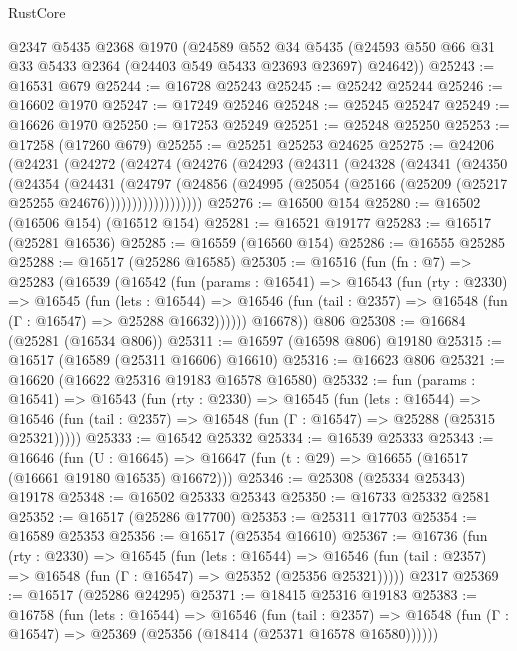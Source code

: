 \begin{lexlean}{RustCore}
\begin{coremodule}
    @2347
    @5435
    @2368
    @1970
    (@24589
      @552
      @34
      @5435
      (@24593 @550 @66 @31 @33 @5433 @2364 (@24403 @549 @5433 @23693 @23697) @24642))
@25243 := @16531 @679
@25244 := @16728 @25243
@25245 := @25242 @25244
@25246 := @16602 @1970
@25247 := @17249 @25246
@25248 := @25245 @25247
@25249 := @16626 @1970
@25250 := @17253 @25249
@25251 := @25248 @25250
@25253 := @17258 (@17260 @679)
@25255 := @25251 @25253 @24625
@25275 := @24206
    (@24231
      (@24272
        (@24274
          (@24276
            (@24293
              (@24311
                (@24328
                  (@24341
                    (@24350
                      (@24354
                        (@24431
                          (@24797
                            (@24856
                              (@24995
                                (@25054 (@25166 (@25209 (@25217 @25255 @24676))))))))))))))))))
@25276 := @16500 @154
@25280 := @16502 (@16506 @154) (@16512 @154)
@25281 := @16521 @19177
@25283 := @16517 (@25281 @16536)
@25285 := @16559 (@16560 @154)
@25286 := @16555 @25285
@25288 := @16517 (@25286 @16585)
@25305 := @16516
    (fun (fn : @7) =>
    @25283
      (@16539
        (@16542
          (fun (params : @16541) =>
          @16543
            (fun (rty : @2330) =>
            @16545
              (fun (lets : @16544) =>
              @16546 (fun (tail : @2357) => @16548 (fun (Γ : @16547) => @25288 @16632))))))
        @16678))
    @806
@25308 := @16684 (@25281 (@16534 @806))
@25311 := @16597 (@16598 @806) @19180
@25315 := @16517 (@16589 (@25311 @16606) @16610)
@25316 := @16623 @806
@25321 := @16620 (@16622 @25316 @19183 @16578 @16580)
@25332 := fun (params : @16541) =>
  @16543
    (fun (rty : @2330) =>
    @16545
      (fun (lets : @16544) =>
      @16546 (fun (tail : @2357) => @16548 (fun (Γ : @16547) => @25288 (@25315 @25321)))))
@25333 := @16542 @25332
@25334 := @16539 @25333
@25343 := @16646
    (fun (U : @16645) => @16647 (fun (t : @29) => @16655 (@16517 (@16661 @19180 @16535) @16672)))
@25346 := @25308 (@25334 @25343) @19178
@25348 := @16502 @25333 @25343
@25350 := @16733 @25332 @2581
@25352 := @16517 (@25286 @17700)
@25353 := @25311 @17703
@25354 := @16589 @25353
@25356 := @16517 (@25354 @16610)
@25367 := @16736
    (fun (rty : @2330) =>
    @16545
      (fun (lets : @16544) =>
      @16546 (fun (tail : @2357) => @16548 (fun (Γ : @16547) => @25352 (@25356 @25321)))))
    @2317
@25369 := @16517 (@25286 @24295)
@25371 := @18415 @25316 @19183
@25383 := @16758
    (fun (lets : @16544) =>
    @16546
      (fun (tail : @2357) =>
      @16548 (fun (Γ : @16547) => @25369 (@25356 (@18414 (@25371 @16578 @16580))))))

\end{coremodule}
\end{lexlean}
